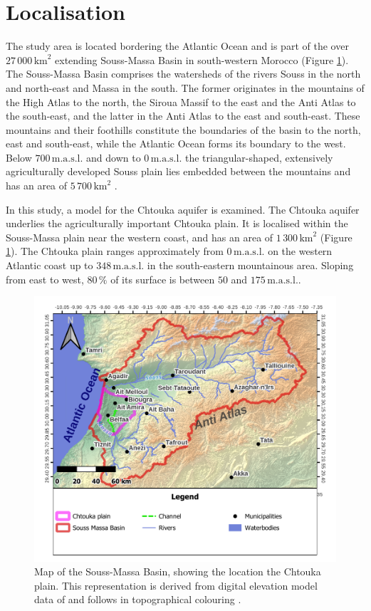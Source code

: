 \section{Localisation}

The study area is located bordering the Atlantic Ocean and is part of the over $27 \, 000 \, \textrm{km}^2$ extending Souss-Massa Basin in south-western Morocco (Figure \ref{Map-SoussMassaRegion}). 
The Souss-Massa Basin comprises the watersheds of the rivers Souss in the north and north-east and Massa in the south. 
The former originates in the mountains of the High Atlas to the north, the Siroua Massif to the east and the Anti Atlas to the south-east, and the latter in the Anti Atlas to the east and south-east. 
These mountains and their foothills constitute the boundaries of the basin to the north, east and south-east, while the Atlantic Ocean forms its boundary to the west. 
Below $700 \, \textrm{m.a.s.l.}$ and down to $0 \, \textrm{m.a.s.l.}$ the triangular-shaped, extensively agriculturally developed Souss plain lies embedded between the mountains and has an area of $5 \, 700 \, \textrm{km}^2$ \parencite{Choukr.2017}.
    
In this study, a model for the Chtouka aquifer is examined. 
The Chtouka aquifer underlies the agriculturally important Chtouka plain. 
It is localised within the Souss-Massa plain near the western coast, and has an area of $1 \, 300 \, \textrm{km}^2$ (Figure \ref{Map-SoussMassaRegion}). 
The Chtouka plain ranges approximately from $0 \, \textrm{m.a.s.l.}$ on the western Atlantic coast up to $348 \, \textrm{m.a.s.l.}$ in the south-eastern mountainous area. 
Sloping from east to west, $80 \, \%$ of its surface is between $50$ and $175 \, \textrm{m.a.s.l.}$.

\begin{figure}[p]
    \centering
    \includegraphics[width=1.0\textwidth]{./img/Map_SoussMassa.pdf}
    \caption{Map of the Souss-Massa Basin, showing the location the Chtouka plain. This representation is derived from digital elevation model data of \textcite{NASA.SRTM1Arc} and follows in topographical colouring \textcite{Hssaisoune.2017}.}
    \label{Map-SoussMassaRegion}
\end{figure}

